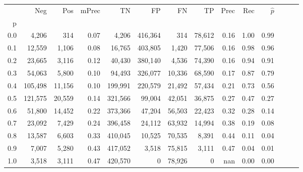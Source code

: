 \begin{tabular}{rrrrrrrrrrrrrr}
\toprule
{} &      Neg &     Pos & mPrec &       TN &       FP &      FN &      TP &  Prec &   Rec & $\hat{p}$ \\
p   &          &         &       &          &          &         &         &       &       &           \\
\midrule
0.0 &    4,206 &     314 &  0.07 &    4,206 &  416,364 &     314 &  78,612 &  0.16 &  1.00 &      0.99 \\
0.1 &   12,559 &   1,106 &  0.08 &   16,765 &  403,805 &   1,420 &  77,506 &  0.16 &  0.98 &      0.96 \\
0.2 &   23,665 &   3,116 &  0.12 &   40,430 &  380,140 &   4,536 &  74,390 &  0.16 &  0.94 &      0.91 \\
0.3 &   54,063 &   5,800 &  0.10 &   94,493 &  326,077 &  10,336 &  68,590 &  0.17 &  0.87 &      0.79 \\
0.4 &  105,498 &  11,156 &  0.10 &  199,991 &  220,579 &  21,492 &  57,434 &  0.21 &  0.73 &      0.56 \\
0.5 &  121,575 &  20,559 &  0.14 &  321,566 &   99,004 &  42,051 &  36,875 &  0.27 &  0.47 &      0.27 \\
0.6 &   51,800 &  14,452 &  0.22 &  373,366 &   47,204 &  56,503 &  22,423 &  0.32 &  0.28 &      0.14 \\
0.7 &   23,092 &   7,429 &  0.24 &  396,458 &   24,112 &  63,932 &  14,994 &  0.38 &  0.19 &      0.08 \\
0.8 &   13,587 &   6,603 &  0.33 &  410,045 &   10,525 &  70,535 &   8,391 &  0.44 &  0.11 &      0.04 \\
0.9 &    7,007 &   5,280 &  0.43 &  417,052 &    3,518 &  75,815 &   3,111 &  0.47 &  0.04 &      0.01 \\
1.0 &    3,518 &   3,111 &  0.47 &  420,570 &        0 &  78,926 &       0 &   nan &  0.00 &      0.00 \\
\bottomrule
\end{tabular}
